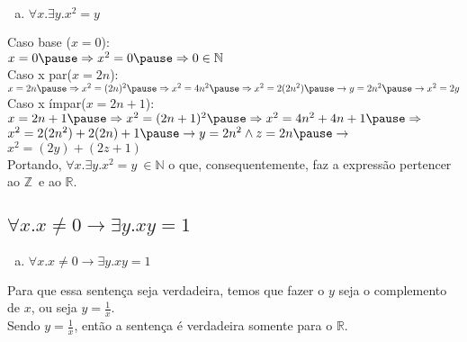\documentclass[aspectratio=43]{beamer}
\newcommand{\Nat}{\mathbb{N}}
\newcommand{\inteiro}{$\mathbb{Z}$}
\newcommand{\real}{$\mathbb{R}$}
\begin{document}
    \begin{frame}[fragile]
     \begin{enumerate}[b)]
		\item $\forall x.\exists y. x^{2} = y$
	\end{enumerate}
    
    Caso base ($x=0$): \\
    \vspace{5pt}
	${x = 0 \pause \Rightarrow x^2 = 0 \pause \Rightarrow 0 \in \Nat}$\\
    \vspace{5pt}
    \pause
    Caso x par($x=2n$):\\
    \vspace{5pt}
    ${x = 2n \pause \Rightarrow x^2 = (2n)^2 \pause \Rightarrow x^2 = 4n^2 \pause \Rightarrow x^2 = 2(2n^2) \pause \rightarrow y = 2n^2 \pause \rightarrow x^2 = 2y}$\\
    \vspace{5pt}
    \pause
    Caso x \'impar($x=2n+1$):\\
    \vspace{5pt}
    ${x = 2n+1 \pause\Rightarrow x^2 = (2n+1)^2 \pause \Rightarrow x^2 = 4n^2 + 4n + 1 \pause \Rightarrow}$\\
    ${x^2 = 2(2n^2) + 2(2n) + 1 \pause \rightarrow y = 2n^2 \land z = 2n \pause\rightarrow}$\\
    ${x^2 = (2y) + (2z +1)}$ \\
    \vspace{5pt}
    \pause
    Portando, $\forall x.\exists y. x^{2} = y \ \in \Nat$ o que, consequentemente, faz a expressão pertencer ao \inteiro \ e ao \real  .

	\end{frame}
    
    \subsection{$\forall x. x \neq 0 \to \exists y.xy = 1 $}
    
    \begin{frame}[fragile]
    \begin{enumerate}[c)]
		\item $\forall x. x \neq 0 \to \exists y.xy = 1 $
	\end{enumerate}
    \vspace{5pt}
    \pause
    Para que essa senten\c ca seja verdadeira, temos que fazer o $y$ seja o complemento de $x$,
    ou seja $y = \frac{1}{x}$.\\
    Sendo  $y = \frac{1}{x}$, então a sentença é verdadeira somente para o \real .
	
	\end{frame}
    
\end{document}
